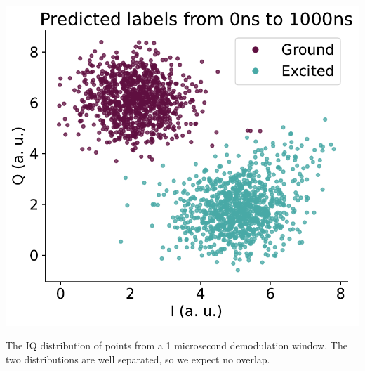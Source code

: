 \begin{marginfigure}
    \centering
    \includegraphics{projects/in_measurement_calibration/Distributions_long_pulse.pdf}
    \caption{The IQ distribution of points from a 1 microsecond demodulation window. The two distributions are well separated, so we expect no overlap.}
    \label{fig:IQ_distribution}
\end{marginfigure}



